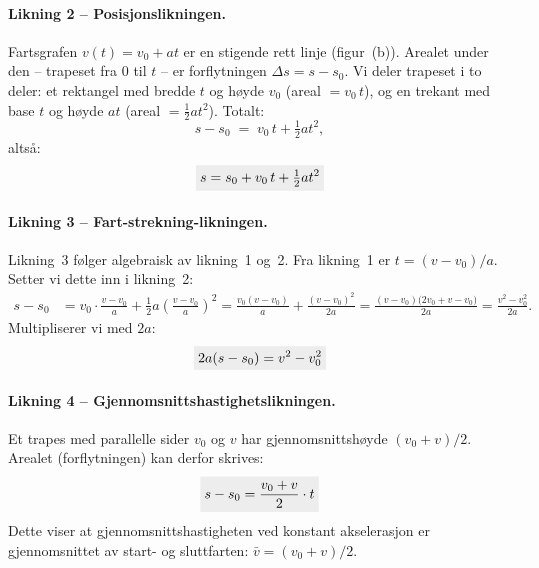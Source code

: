 \paragraph{Likning 2 – Posisjonslikningen.}
Fartsgrafen $v(t) = v_0 + at$ er en stigende rett linje (figur~(b)). Arealet under den – trapeset fra $0$ til $t$ – er forflytningen $\Delta s = s - s_0$. Vi deler trapeset i to deler: et rektangel med bredde $t$ og høyde $v_0$ (areal $= v_0\,t$), og en trekant med base $t$ og høyde $at$ (areal $= \tfrac{1}{2}at^2$). Totalt:
\[
  s - s_0 \;=\; v_0\,t + \tfrac{1}{2}at^2,
\]
altså:
\begin{align}
  \colorbox{black!7}{$\displaystyle s = s_0 + v_0\,t + \tfrac{1}{2}at^2$}
\end{align}

\paragraph{Likning 3 – Fart-strekning-likningen.}
Likning~3 følger algebraisk av likning~1 og~2. Fra likning~1 er $t = (v - v_0)/a$. Setter vi dette inn i likning~2:
\begin{align*}
  s - s_0
  &= v_0\cdot\frac{v-v_0}{a} + \tfrac{1}{2}a\left(\frac{v-v_0}{a}\right)^2
   = \frac{v_0(v-v_0)}{a} + \frac{(v-v_0)^2}{2a}
   = \frac{(v-v_0)\bigl(2v_0 + v - v_0\bigr)}{2a}
   = \frac{v^2 - v_0^2}{2a}.
\end{align*}
Multipliserer vi med $2a$:
\begin{align}
  \colorbox{black!7}{$\displaystyle 2a(s-s_0) = v^2 - v_0^2$}
\end{align}

\paragraph{Likning 4 – Gjennomsnittshastighetslikningen.}
Et trapes med parallelle sider $v_0$ og $v$ har gjennomsnittshøyde $(v_0 + v)/2$. Arealet (forflytningen) kan derfor skrives:
\begin{align}
  \colorbox{black!7}{$\displaystyle s - s_0 = \frac{v_0 + v}{2}\cdot t$}
\end{align}
Dette viser at gjennomsnittshastigheten ved konstant akselerasjon er gjennomsnittet av start- og sluttfarten: $\bar{v} = (v_0 + v)/2$.

